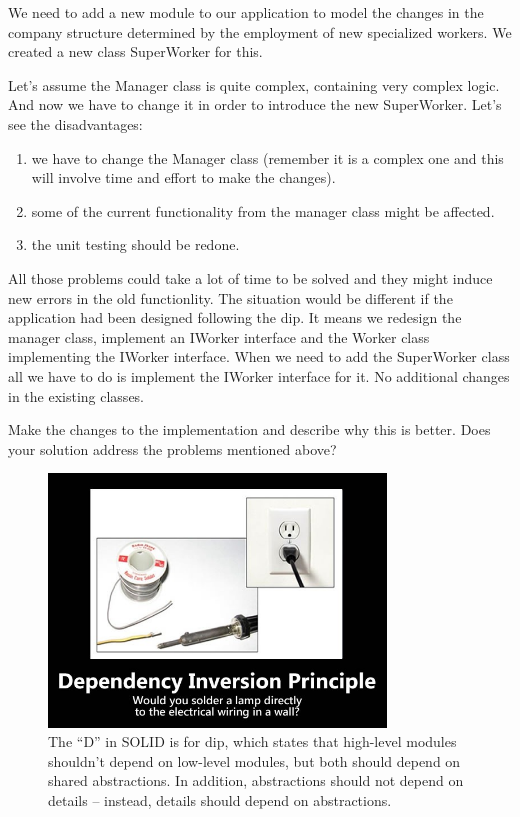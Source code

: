We need to add a new module to our application to model the changes in the company structure determined by the employment of new specialized workers.
We created a new class SuperWorker for this.

Let's assume the Manager class is quite complex, containing very complex logic.
And now we have to change it in order to introduce the new SuperWorker.
Let's see the disadvantages:

\begin{enumerate}
	\item we have to change the Manager class (remember it is a complex one and this will involve time and effort to make the changes).
	\item some of the current functionality from the manager class might be affected.
	\item the unit testing should be redone.
\end{enumerate}

All those problems could take a lot of time to be solved and they might induce new errors in the old functionlity.
The situation would be different if the application had been designed following the \gls{dip}.
It means we redesign the manager class, implement an IWorker interface and the Worker class implementing the IWorker interface.
When we need to add the SuperWorker class all we have to do is implement the IWorker interface for it.
No additional changes in the existing classes.

\begin{exercise}
	Make the changes to the implementation and describe why this is better.
	Does your solution address the problems mentioned above? 
\end{exercise}

\begin{figure}
	\centering
	\includegraphics[width=0.8\textwidth]{images/kotlin/DIP.jpg}
	\caption{The “D” in SOLID is for \gls{dip}, which states that high-level modules shouldn’t depend on low-level modules, but both should depend on shared abstractions.
		In addition, abstractions should not depend on details – instead, details should depend on abstractions.}
	\label{fir:dsp}
\end{figure}


